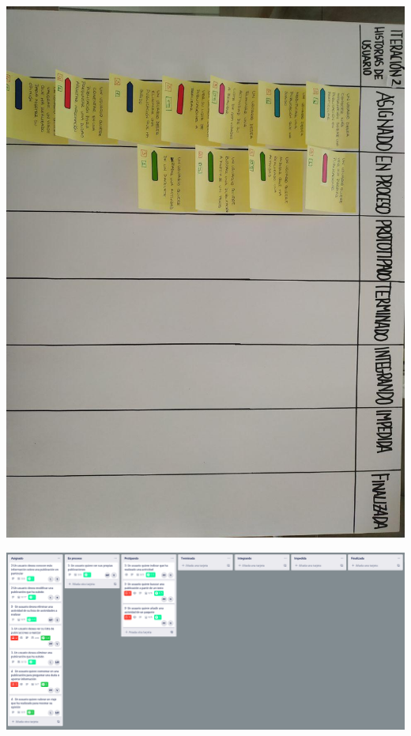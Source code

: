 \documentclass[spanish]{beamer}
\begin{document}
\begin{frame}
	\begin{center}
		\includegraphics[angle=90, scale=0.32]{papel2_1}
	\end{center}
\end{frame}


\begin{frame}
	\begin{center}
		\includegraphics[scale=0.24]{trello2_3}
	\end{center}
\end{frame}
\end{document}
